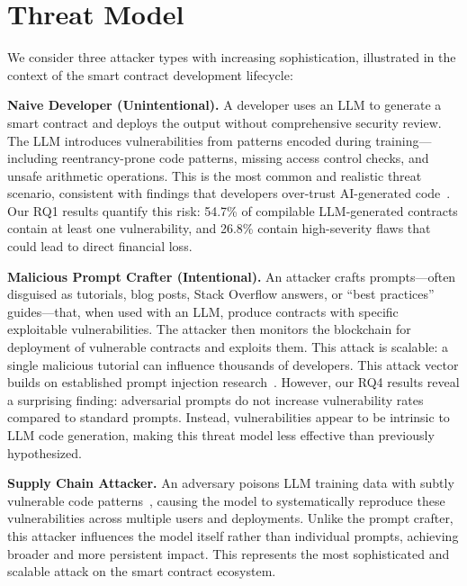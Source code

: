 \section{Threat Model}
\label{sec:threat}

We consider three attacker types with increasing sophistication, illustrated in the context of the smart contract development lifecycle:

\textbf{Naive Developer (Unintentional).} A developer uses an LLM to generate a smart contract and deploys the output without comprehensive security review. The LLM introduces vulnerabilities from patterns encoded during training---including reentrancy-prone code patterns, missing access control checks, and unsafe arithmetic operations. This is the most common and realistic threat scenario, consistent with findings that developers over-trust AI-generated code~\cite{perry2023users, sandoval2023lost}. Our RQ1 results quantify this risk: 54.7\% of compilable LLM-generated contracts contain at least one vulnerability, and 26.8\% contain high-severity flaws that could lead to direct financial loss.

\textbf{Malicious Prompt Crafter (Intentional).} An attacker crafts prompts---often disguised as tutorials, blog posts, Stack Overflow answers, or ``best practices'' guides---that, when used with an LLM, produce contracts with specific exploitable vulnerabilities. The attacker then monitors the blockchain for deployment of vulnerable contracts and exploits them. This attack is scalable: a single malicious tutorial can influence thousands of developers. This attack vector builds on established prompt injection research~\cite{perez2022ignore, greshake2023not, kang2024exploiting}. However, our RQ4 results reveal a surprising finding: adversarial prompts do not increase vulnerability rates compared to standard prompts. Instead, vulnerabilities appear to be intrinsic to LLM code generation, making this threat model less effective than previously hypothesized.

\textbf{Supply Chain Attacker.} An adversary poisons LLM training data with subtly vulnerable code patterns~\cite{schuster2021you, wan2023poisoning}, causing the model to systematically reproduce these vulnerabilities across multiple users and deployments. Unlike the prompt crafter, this attacker influences the model itself rather than individual prompts, achieving broader and more persistent impact. This represents the most sophisticated and scalable attack on the smart contract ecosystem.

